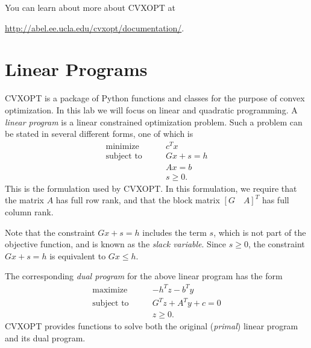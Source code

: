 \label{lab:Optimization 2}

You can learn about more about CVXOPT at

\url{http://abel.ee.ucla.edu/cvxopt/documentation/}.

\section*{Linear Programs}

CVXOPT is a package of Python functions and classes for the purpose of convex optimization.
In this lab we will focus on linear and quadratic programming.
A \emph{linear program} is a linear constrained optimization problem. Such a problem can be stated in several
different forms, one of which is
\begin{align*}
\text{minimize}\qquad &c^Tx \\
\text{subject to}\qquad &Gx + s = h\\
&Ax = b \\
 &s \geq 0.
\end{align*}
This is the formulation used by CVXOPT.
In this formulation, we require that the matrix $A$ has full row rank,
and that the block matrix $[G \quad A]^T$ has full column rank.

Note that the constraint $Gx +s = h$ includes the term $s$, which is not part of the objective
function, and is known as the \emph{slack variable}. Since $s  \geq 0$, the constraint
$Gx + s = h$ is equivalent to $Gx \leq h$.

The corresponding \emph{dual program} for the above linear program has the form
\begin{align*}
\text{maximize}\qquad &-h^Tz - b^Ty \\
\text{subject to}\qquad &G^Tz + A^Ty + c = 0\\
 &z \geq 0.
\end{align*}
CVXOPT provides functions to solve both the original (\emph{primal}) linear program and its dual program.

